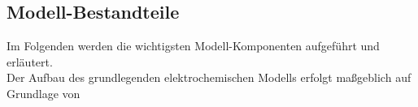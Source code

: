 \documentclass[onecolumn,10pt,titlepage]{article}
\begin{document}
%
\subsection{Modell-Bestandteile}
Im Folgenden werden die wichtigsten Modell-Komponenten aufgeführt und erläutert.\\
Der Aufbau des grundlegenden elektrochemischen Modells erfolgt maßgeblich auf Grundlage von \cite{Chandesris2015,Schalenbach2013,Tjarks.2017,EspinosaLopez.2018,Gabrielli2016}
\end{document}
